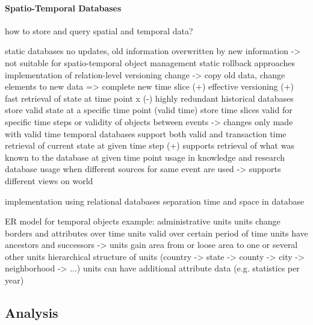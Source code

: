 \paragraph{Spatio-Temporal Databases} %
\label{par:spatio_temporal_databases}

how to store and query spatial and temporal data?

static databases
  no updates, old information overwritten by new information
  -> not suitable for spatio-temporal object management
static rollback approaches
  implementation of relation-level versioning
  change -> copy old data, change elements to new data => complete new time slice
  (+) effective versioning
  (+) fast retrieval of state at time point x
  (-) highly redundant
historical databases
  store valid state at a specific time point (valid time)
  store time slices valid for specific time steps
  or validity of objects between events
  -> changes only made with valid time
temporal databases
  support both valid and transaction time
  retrieval of current state at given time step
  (+) supports retrieval of what was known to the database at given time point
  usage in knowledge and research database
  usage when different sources for same event are used
  -> supports different views on world

implementation using relational databases
separation time and space in database

ER model for temporal objects
  example: administrative units
  units change borders and attributes over time
  units valid over certain period of time
  units have ancestors and successors
  -> units gain area from or loose area to one or several other units
  hierarchical structure of units (country -> state -> county -> city -> neighborhood -> ...)
  units can have additional attribute data (e.g. statistics per year)
  \cite[p. 67-68]{ott2001time}




\subsection{Analysis} %
\label{sub:analysis}


